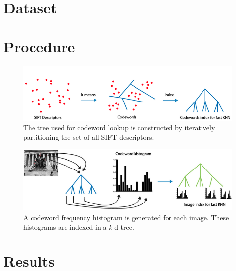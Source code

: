 \documentclass[twocolumn]{article}
\newcommand{\sectionfile}[3]{\section{#1} \label{sec:#2} }
\begin{document}
\sectionfile{Dataset}{dataset}{dataset.tex}
\sectionfile{Procedure}{procedure}{procedure.tex}
\begin{figure}
\includegraphics[width=\linewidth]{procedure1.png}
\caption{The tree used for codeword lookup is constructed by iteratively partitioning the set of all SIFT descriptors.}
\end{figure}
\begin{figure}
\includegraphics[width=\linewidth]{procedure2.png}
\caption{A codeword frequency histogram is generated for each image. These histograms are indexed in a \emph{k}-d tree.}
\label{overflow}

\end{figure}
\sectionfile{Results}{results}{results.tex}
\end{document}
